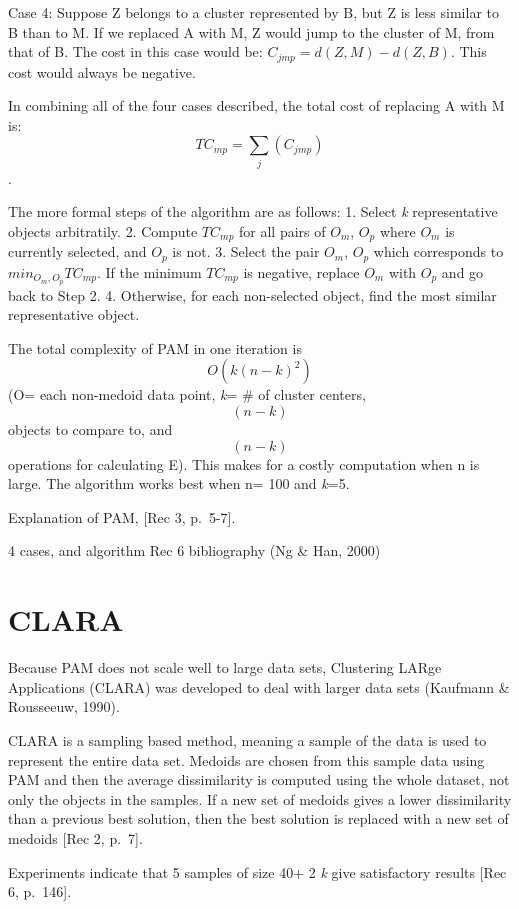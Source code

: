 \documentclass[12pt,twoside]{amherstthesis}
\begin{document}
  Case 4: Suppose Z belongs to a cluster represented by B, but Z is less
  similar to B than to M. If we replaced A with M, Z would jump to the
  cluster of M, from that of B. The cost in this case would be:
  \(C_{jmp} = d(Z, M) - d(Z, B)\). This cost would always be negative.
  
  In combining all of the four cases described, the total cost of
  replacing A with M is: \[ TC_{mp} = \sum_j(C_{jmp}) \].
  
  The more formal steps of the algorithm are as follows: 1. Select
  \emph{k} representative objects arbitratily. 2. Compute \(TC_{mp}\) for
  all pairs of \(O_m\), \(O_p\) where \(O_m\) is currently selected, and
  \(O_p\) is not. 3. Select the pair \(O_m\), \(O_p\) which corresponds to
  \(min_{O_m, O_p} TC_{mp}\). If the minimum \(TC_{mp}\) is negative,
  replace \(O_m\) with \(O_p\) and go back to Step 2. 4. Otherwise, for
  each non-selected object, find the most similar representative object.
  
  The total complexity of PAM in one iteration is \[O(k(n-k)^2)\] (O= each
  non-medoid data point, \emph{k}= \# of cluster centers, \[(n-k)\]
  objects to compare to, and \[(n-k)\] operations for calculating E). This
  makes for a costly computation when n is large. The algorithm works best
  when n= 100 and \emph{k}=5.
  
  Explanation of PAM, {[}Rec 3, p.~5-7{]}.
  
  4 cases, and algorithm Rec 6 bibliography (Ng \& Han, 2000)
  
  \section{CLARA}\label{clara}
  
  Because PAM does not scale well to large data sets, Clustering LARge
  Applications (CLARA) was developed to deal with larger data sets
  (Kaufmann \& Rousseeuw, 1990).
  
  CLARA is a sampling based method, meaning a sample of the data is used
  to represent the entire data set. Medoids are chosen from this sample
  data using PAM and then the average dissimilarity is computed using the
  whole dataset, not only the objects in the samples. If a new set of
  medoids gives a lower dissimilarity than a previous best solution, then
  the best solution is replaced with a new set of medoids {[}Rec 2,
  p.~7{]}.
  
  Experiments indicate that 5 samples of size 40+ 2 \emph{k} give
  satisfactory results {[}Rec 6, p.~146{]}.
  
\end{document}
